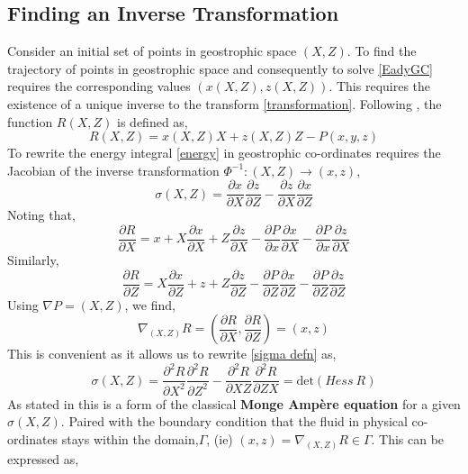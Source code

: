 \subsection{Finding an Inverse Transformation}
Consider an initial set of points in geostrophic space $(X,Z)$. To find the trajectory of points in geostrophic space and consequently to solve \ref{EadyGC} requires the corresponding values $\left(x(X,Z),z(X,Z)\right)$. This requires the existence of a unique inverse to the transform \ref{transformation}. Following \cite{Cullen2006a}, the function $R(X,Z)$ is defined as,
\begin{equation*}
	R(X,Z) = x(X,Z)X+z(X,Z)Z - P(x,y,z)
\end{equation*}
To rewrite the energy integral \ref{energy} in geostrophic co-ordinates requires the Jacobian of the inverse transformation $\Phi ^{-1}: (X,Z) \rightarrow (x,z)$, 
\begin{equation}
	\sigma(X,Z) = \frac{\partial x}{\partial X}\frac{\partial z}{\partial Z} - \frac{\partial z}{\partial X}\frac{\partial x}{\partial Z}
\label{sigma defn}
\end{equation}
Noting that,
\begin{equation*}
	\frac{\partial R}{\partial X} = x + X\frac{\partial x}{\partial X} + Z\frac{\partial z}{\partial X} -\frac{\partial P}{\partial x}\frac{\partial x}{\partial X} - \frac{\partial P}{\partial x}\frac{\partial z}{\partial X}
\end{equation*}
Similarly,
\begin{equation*}
\frac{\partial R}{\partial Z} = X\frac{\partial x}{\partial Z} + z + Z\frac{\partial z}{\partial Z} -\frac{\partial P}{\partial Z}\frac{\partial x}{\partial Z} - \frac{\partial P}{\partial Z}\frac{\partial z}{\partial Z}
\end{equation*}
Using $\nabla P = (X,Z)$, we find,
\begin{equation}
	\nabla_{(X,Z)} R = \left(\frac{\partial R}{\partial X},\frac{\partial R}{\partial Z}\right) = (x,z)
	\label{gradR}
\end{equation}
This is convenient as it allows us to rewrite \ref{sigma defn} as,
\begin{equation}
\sigma(X,Z) = \frac{\partial^2 R}{\partial X^2}\frac{\partial^2 R}{\partial Z^2} -\frac{\partial^2 R}{\partial XZ}\frac{\partial^2 R}{\partial ZX} = \textrm{det}(Hess \ R)
\label{Monge Ampere}
\end{equation}
As stated in \cite{Cullen2006a} this is a form of the classical \textbf{Monge Amp\`{e}re equation} for a given $\sigma(X,Z)$. Paired with the boundary condition that the fluid in physical co-ordinates stays within the domain,$\Gamma$, (ie) $(x,z) = \nabla_{(X,Z)}R \in \Gamma$. This can be expressed as,
